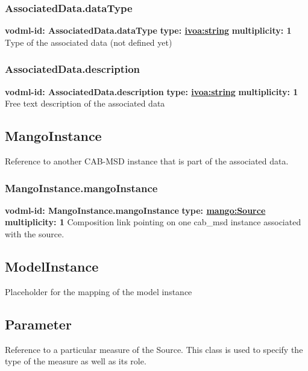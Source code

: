     \subsubsection{AssociatedData.dataType}
      \textbf{vodml-id: AssociatedData.dataType} \newline
      \textbf{type: \hyperref[sect:ivoa]{ivoa:string}} \newline
      \textbf{multiplicity: 1} \newline 
      Type of the associated data (not defined yet)

    \subsubsection{AssociatedData.description}
      \textbf{vodml-id: AssociatedData.description} \newline
      \textbf{type: \hyperref[sect:ivoa]{ivoa:string}} \newline
      \textbf{multiplicity: 1} \newline 
      Free text description of the associated data
  \subsection{MangoInstance}
  \label{sect:MangoInstance}
    Reference to another CAB-MSD instance that is part of the associated data.

    \subsubsection{MangoInstance.mangoInstance}
      \textbf{vodml-id: MangoInstance.mangoInstance} \newline
      \textbf{type: \hyperref[sect:Source]{mango:Source}} \newline
      \textbf{multiplicity: 1} \newline 
      Composition link pointing on one cab\_msd instance associated with the source.

  \subsection{ModelInstance}
  \label{sect:ModelInstance}
    Placeholder for the mapping of the model instance

  \subsection{Parameter}
  \label{sect:Parameter}
    Reference to a particular measure of the Source. This class is used to specify the type of the measure as well as its role.

